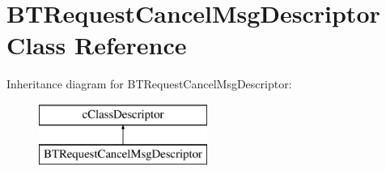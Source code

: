 \hypertarget{classBTRequestCancelMsgDescriptor}{}\section{B\+T\+Request\+Cancel\+Msg\+Descriptor Class Reference}
\label{classBTRequestCancelMsgDescriptor}
Inheritance diagram for B\+T\+Request\+Cancel\+Msg\+Descriptor\+:\begin{figure}[H]
\begin{center}
\leavevmode
\includegraphics[height=2.000000cm]{classBTRequestCancelMsgDescriptor}
\end{center}
\end{figure}
